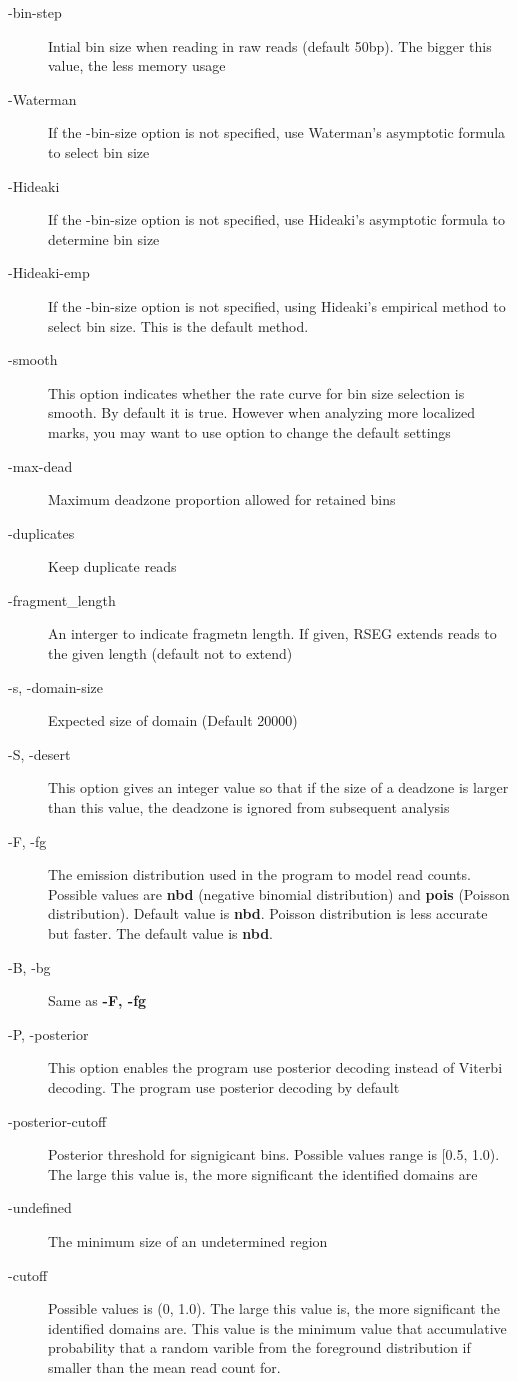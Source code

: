 \documentclass[11pt]{report}
\begin{document}
\begin{description}
\item[-bin-step] Intial bin size when reading in raw reads
  (default 50bp). The bigger this value, the less memory usage
\item[-Waterman] If the -bin-size option is not specified, use
  Waterman's asymptotic formula to select bin size
\item[-Hideaki] If the -bin-size option is not specified, use
  Hideaki's asymptotic formula to determine bin size
\item[-Hideaki-emp] If the -bin-size option is not specified, using
  Hideaki's empirical method to select bin size. This is the default
  method.
\item[-smooth] This option indicates whether the rate curve for bin
  size selection is smooth. By default it is true. However when
  analyzing more localized marks, you may want to use option to change
  the default settings
\item[-max-dead] Maximum deadzone proportion allowed for
  retained bins
\item[-duplicates] Keep duplicate reads
\item[-fragment\_length] An interger to indicate fragmetn length. If given, RSEG
  extends reads to the given length (default not to extend)
\item[-s, -domain-size] Expected size of domain (Default 20000) 
\item[-S, -desert] This option gives an integer value so that if
  the size of a deadzone is larger than this value, the deadzone is
  ignored from subsequent analysis
\item[-F, -fg] The emission distribution used in the program to model
  read counts. Possible values are \textbf{nbd} (negative binomial
  distribution) and \textbf{pois} (Poisson distribution). Default
  value is \textbf{nbd}. Poisson distribution is less accurate but
  faster.  The default value is \textbf{nbd}.
\item[-B, -bg] Same as \textbf{-F, -fg} 
\item[-P, -posterior] This option enables the program use posterior
  decoding instead of Viterbi decoding. The program use posterior
  decoding by default
\item[-posterior-cutoff] Posterior threshold for signigicant
  bins. Possible values range is [0.5, 1.0). The large this value is,
  the more significant the identified domains are
\item[-undefined] The minimum size of an undetermined region
\item[-cutoff] Possible values is (0, 1.0). The large this value
  is, the more significant the identified domains are. This value is
  the minimum value that accumulative probability that a random
  varible from the foreground distribution if smaller than the mean
  read count for.
\end{description}
\end{document}
